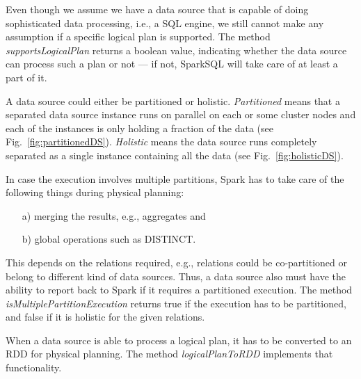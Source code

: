 \documentclass{article}
\begin{document}
Even though we assume we have a data source that is capable of doing sophisticated data processing, i.e., a SQL engine, we still cannot make any assumption if a specific logical plan is supported. The method \textit{supportsLogicalPlan} returns a boolean value, indicating whether the data source can process such a plan or not --- if not, SparkSQL will take care of at least a part of it. 

A data source could either be partitioned or holistic. \textit{Partitioned} means that a separated data source instance runs on parallel on each or some cluster nodes and each of the instances is only holding a fraction of the data (see Fig.~\ref{fig:partitionedDS}). \textit{Holistic} means the data source runs completely separated as a single instance containing all the data (see Fig.~\ref{fig:holisticDS}). 

In case the execution involves multiple partitions, Spark has to take care of the following things during physical planning:
\begin{itemize}
  \item[a)] merging the results, e.g., aggregates and
  \item[b)] global operations such as DISTINCT. 
\end{itemize}
  
This depends on the relations required, e.g., relations could be co-partitioned or belong to different kind of data sources. Thus, a data source also must have the ability to report back to Spark if it requires a partitioned execution. The method \textit{isMultiplePartitionExecution} returns true if the execution has to be partitioned, and false if it is holistic for the given relations. 

When a data source is able to process a logical plan, it has to be converted to an RDD for physical planning. The method \textit{logicalPlanToRDD} implements that functionality.
\end{document}

